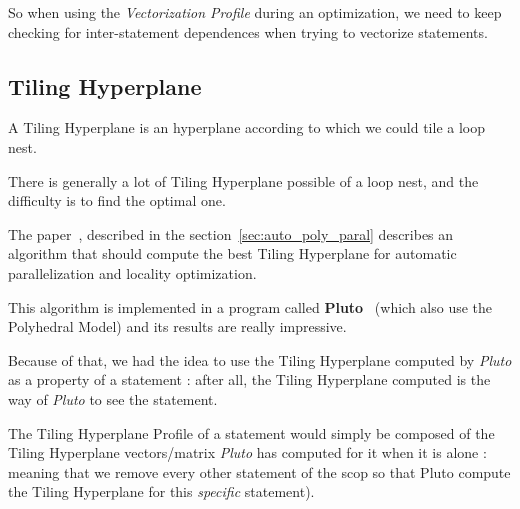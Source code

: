 \documentclass[paper=a4, fontsize=11.5pt]{scrartcl}
\numberwithin{equation}{section}        %
\numberwithin{figure}{section}          %
\numberwithin{table}{section}               %
\begin{document}
    So when using the \textit{Vectorization Profile} during an optimization, we need to keep
    checking for inter-statement dependences when trying to vectorize statements.


    \subsection{Tiling Hyperplane}
        A Tiling Hyperplane is an hyperplane according to which we could tile a loop nest.
        
        There is generally a lot of Tiling Hyperplane possible of a loop nest, and the difficulty
        is to find the optimal one.

        The paper~\cite{Bondhugula:2008:PAP:1379022.1375595}, described in the section~\ref{sec:auto_poly_paral}
        describes an algorithm that should compute the best Tiling Hyperplane for automatic
        parallelization and locality optimization.

        This algorithm is implemented in a program called \textbf{Pluto}~\cite{pluto} (which also
        use the Polyhedral Model) and its results are really impressive.

        Because of that, we had the idea to use the Tiling Hyperplane computed by \textit{Pluto}
        as a property of a statement : after all, the Tiling Hyperplane computed is the way
        of \textit{Pluto} to see the statement.

        The Tiling Hyperplane Profile of a statement would simply be composed
        of the Tiling Hyperplane vectors/matrix \textit{Pluto} has computed for
        it when it is alone : meaning that we remove every other
        statement of the scop so that Pluto compute the Tiling Hyperplane for this \textit{specific}
        statement).


\end{document}
